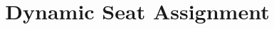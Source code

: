 \documentclass{article}
\title{Dynamic Seat Assignment}
\begin{document}
\maketitle{}















% 




% 

% 

% 

% 
\end{document}
